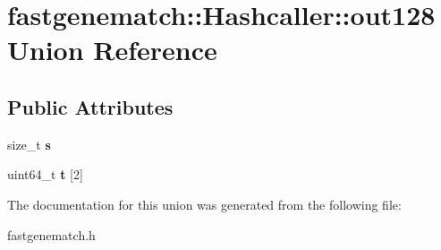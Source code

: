 \hypertarget{unionfastgenematch_1_1Hashcaller_1_1out128}{
\section{fastgenematch::Hashcaller::out128 Union Reference}
\label{unionfastgenematch_1_1Hashcaller_1_1out128}
}
\subsection*{Public Attributes}
\begin{DoxyCompactItemize}
\item 
\hypertarget{unionfastgenematch_1_1Hashcaller_1_1out128_ab3cfe6bc66359064c054b3cb499f349c}{
size\_\-t {\bfseries s}}
\label{unionfastgenematch_1_1Hashcaller_1_1out128_ab3cfe6bc66359064c054b3cb499f349c}

\item 
\hypertarget{unionfastgenematch_1_1Hashcaller_1_1out128_a3787f3897a3825707dfae44257e44d16}{
uint64\_\-t {\bfseries t} \mbox{[}2\mbox{]}}
\label{unionfastgenematch_1_1Hashcaller_1_1out128_a3787f3897a3825707dfae44257e44d16}

\end{DoxyCompactItemize}


The documentation for this union was generated from the following file:\begin{DoxyCompactItemize}
\item 
fastgenematch.h\end{DoxyCompactItemize}
